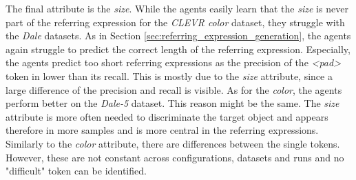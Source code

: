 The final attribute is the \emph{size}.
While the agents easily learn that the \emph{size} is never part of the referring expression for the \emph{CLEVR color} dataset, they struggle with the \emph{Dale} datasets.
As in Section \ref{sec:referring_expression_generation}, the agents again struggle to predict the correct length of the referring expression.
Especially, the agents predict too short referring expressions as the precision of the \emph{<pad>} token in lower than its recall.
This is mostly due to the \emph{size} attribute, since a large difference of the precision and recall is visible.
As for the \emph{color}, the agents perform better on the \emph{Dale-5} dataset.
This reason might be the same.
The \emph{size} attribute is more often needed to discriminate the target object and appears therefore in more samples and is more central in the referring expressions.
Similarly to the \emph{color} attribute, there are differences between the single tokens.
However, these are not constant across configurations, datasets and runs and no "difficult" token can be identified.

